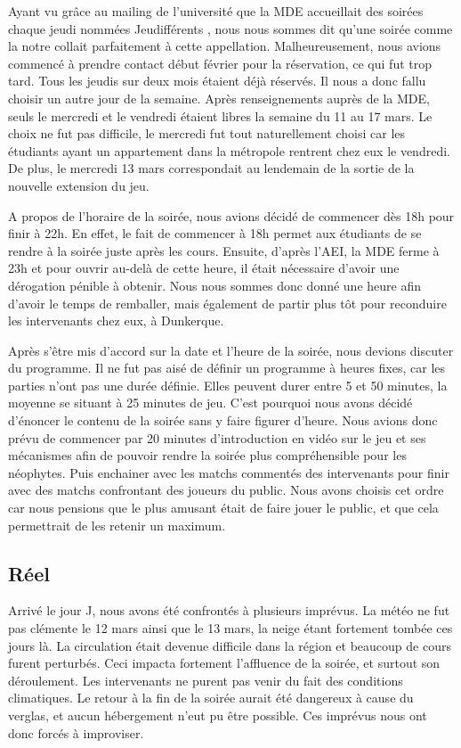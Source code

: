 Ayant vu grâce au mailing de l’université que la MDE accueillait des soirées chaque jeudi
nommées \og Jeudifférents \fg{}, nous nous sommes dit qu’une soirée comme la notre collait
parfaitement à cette appellation. Malheureusement, nous avions commencé à prendre contact
début février pour la réservation, ce qui fut trop tard. Tous les jeudis sur deux mois étaient
déjà réservés.
Il nous a donc fallu choisir un autre jour de la semaine. Après renseignements auprès de la
MDE, seuls le mercredi et le vendredi étaient libres la semaine du 11 au 17 mars. Le choix ne
fut pas difficile, le mercredi fut tout naturellement choisi car les étudiants ayant un appartement
dans la métropole rentrent chez eux le vendredi. De plus, le mercredi 13 mars correspondait
au lendemain de la sortie de la nouvelle extension du jeu.

A propos de l’horaire de la soirée, nous avions décidé de commencer dès 18h pour finir à
22h. En effet, le fait de commencer à 18h permet aux étudiants de se rendre à la soirée juste
après les cours. Ensuite, d’après l’AEI, la MDE ferme à 23h et pour ouvrir au-delà de cette
heure, il était nécessaire d’avoir une dérogation pénible à obtenir. Nous nous sommes donc
donné une heure afin d’avoir le temps de remballer, mais également de partir plus tôt pour
reconduire les intervenants chez eux, à Dunkerque.

Après s’être mis d’accord sur la date et l’heure de la soirée, nous devions discuter du
programme.
Il ne fut pas aisé de définir un programme à heures fixes, car les parties n’ont pas une durée
définie. Elles peuvent durer entre 5 et 50 minutes, la moyenne se situant à 25 minutes de jeu.
C’est pourquoi nous avons décidé d’énoncer le contenu de la soirée sans y faire figurer
d’heure.
Nous avions donc prévu de commencer par 20 minutes d’introduction en vidéo sur le jeu et
ses mécanismes afin de pouvoir rendre la soirée plus compréhensible pour les néophytes.
Puis enchainer avec les matchs commentés des intervenants pour finir avec des matchs
confrontant des joueurs du public. Nous avons choisis cet ordre car nous pensions que le plus
amusant était de faire jouer le public, et que cela permettrait de les retenir un maximum.

\subsection{Réel}%
\label{sub:reel}

Arrivé le jour J, nous avons été confrontés à plusieurs imprévus.
La météo ne fut pas clémente le 12 mars ainsi que le 13 mars, la neige étant fortement
tombée ces jours là. La circulation était devenue difficile dans la région et beaucoup de cours
furent perturbés.
Ceci impacta fortement l’affluence de la soirée, et surtout son déroulement. Les intervenants
ne purent pas venir du fait des conditions climatiques. Le retour à la fin de la soirée aurait été
dangereux à cause du verglas, et aucun hébergement n’eut pu être possible.
Ces imprévus nous ont donc forcés à improviser.

